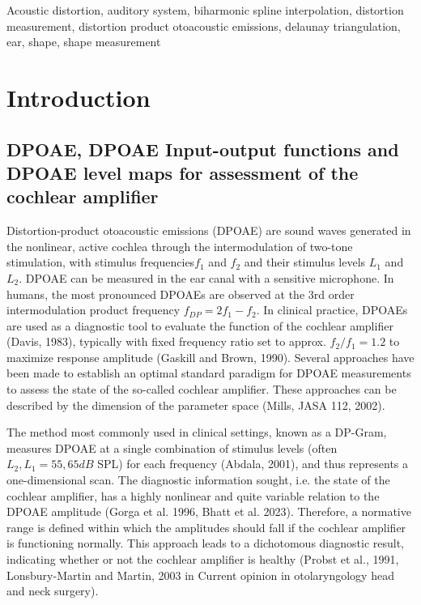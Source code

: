 \documentclass[journal,twoside,web]{ieeecolor2}
\begin{document}
\begin{IEEEkeywords}
Acoustic distortion,
auditory system,
biharmonic spline interpolation,
distortion measurement,
distortion product otoacoustic emissions,
delaunay triangulation,
ear,
shape,
shape measurement
\end{IEEEkeywords}

\section{Introduction}
\label{sec:introduction}
\subsection{DPOAE, DPOAE Input-output functions and DPOAE level maps for assessment of the cochlear amplifier}
Distortion-product otoacoustic emissions (DPOAE) are sound waves generated in the nonlinear, active cochlea through the intermodulation of two-tone stimulation, with stimulus frequencies$f_1$ and $f_2$ and their stimulus levels $L_1$ and $L_2$. DPOAE can be measured in the ear canal with a sensitive microphone. In humans, the most pronounced DPOAEs are observed at the 3rd order intermodulation product frequency $f_{DP} = 2f_1 - f_2$. In clinical practice, DPOAEs are used as a diagnostic tool to evaluate the function of the cochlear amplifier (Davis, 1983), typically with fixed frequency ratio set to approx. $f_2 / f_1 = 1.2$ to maximize response amplitude (Gaskill and Brown, 1990). Several approaches have been made to establish an optimal standard paradigm for DPOAE measurements to assess the state of the so-called cochlear amplifier. These approaches can be described by the dimension of the parameter space (Mills, JASA 112, 2002).

The method most commonly used in clinical settings, known as a DP-Gram, measures DPOAE at a single combination of stimulus levels (often $L_2, L_1 = 55, 65 dB$ SPL) for each frequency (Abdala, 2001), and thus represents a one-dimensional scan. The diagnostic information sought, i.e. the state of the cochlear amplifier, has a highly nonlinear and quite variable relation to the DPOAE amplitude (Gorga et al. 1996, Bhatt et al. 2023). Therefore, a normative range is defined within which the amplitudes should fall if the cochlear amplifier is functioning normally. This approach leads to a dichotomous diagnostic result, indicating whether or not the cochlear amplifier is healthy (Probst et al., 1991, Lonsbury-Martin and Martin, 2003 in Current opinion in otolaryngology head and neck surgery).
 
\end{document}
